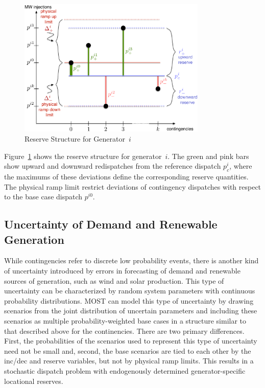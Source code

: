 \documentclass[12pt]{article}
\newcommand{\most}[0]{{MOST}}
\numberwithin{equation}{section}
\numberwithin{table}{section}
\numberwithin{figure}{section}
\begin{document}
\begin{figure}[hbtp]
  \centering
  \includegraphics[width=0.8\textwidth]{./figures/reserves-single-base}
  \caption{Reserve Structure for Generator~$i$}
  \label{fig:reserves_single_base}
\end{figure}

Figure~\ref{fig:reserves_single_base} shows the reserve structure for generator~$i$. The green and pink bars show upward and downward redispatches from the reference dispatch $p_c^i$, where the maximums of these deviations define the corresponding reserve quantities. The physical ramp limit restrict deviations of contingency dispatches with respect to the base case dispatch $p^{i0}$.

\subsection{Uncertainty of Demand and Renewable Generation}

While contingencies refer to discrete low probability events, there is another kind of uncertainty introduced by errors in forecasting of demand and renewable sources of generation, such as wind and solar production. This type of uncertainty can be characterized by random system parameters with continuous probability distributions. \most{} can model this type of uncertainty by drawing scenarios from the joint distribution of uncertain parameters and including these scenarios as multiple probability-weighted base cases in a structure similar to that described above for the continencies. There are two primary differences. First, the probabilities of the scenarios used to represent this type of uncertainty need not be small and, second, the base scenarios are tied to each other by the inc/dec and reserve variables, but not by physical ramp limits. This results in a stochastic dispatch problem with endogenously determined generator-specific locational reserves.
\end{document}
